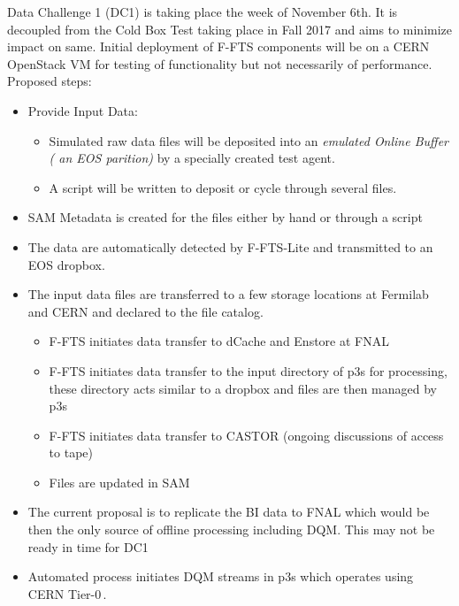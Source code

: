 \documentclass[pdftex,12pt,letter]{article}
\newcommand{\pd}{protoDUNE\xspace}
\begin{document}
Data Challenge 1 (DC1) is taking place the week of November 6th.
It is decoupled from the Cold Box Test taking place in Fall 2017 and aims to minimize impact on same.
Initial deployment of F-FTS components will be on a CERN OpenStack VM for testing of functionality
but not necessarily of performance. Proposed steps:
\begin{itemize}

\item Provide Input Data: 
\begin{itemize}
\item Simulated raw data files will be deposited into an \emph{emulated Online Buffer ( an EOS parition)} by a specially created test agent.
\item A script will be written to deposit or cycle through several files. 
\end{itemize}
\item SAM Metadata is created for the files either by hand or through a script

\item The data  are automatically detected by F-FTS-Lite and transmitted to an EOS dropbox.

\item The input data files are transferred to a few storage locations at Fermilab and CERN and
declared to the file catalog.
\begin{itemize}
\item F-FTS initiates data transfer to dCache and Enstore at FNAL
\item F-FTS initiates data transfer to the input directory of p3s for processing, these directory acts similar to a dropbox and files are then managed by p3s
\item F-FTS initiates data transfer to CASTOR (ongoing discussions of access to tape)
\item Files are updated in SAM
\end{itemize}

\item %
The current proposal is to replicate the BI data to FNAL which would be then the only
source of offline processing including DQM. This may not be ready in time for DC1

\item Automated process initiates DQM streams in p3s which operates using
CERN Tier-0\,\cite{lxbatch}.


\end{itemize}
\end{document}
